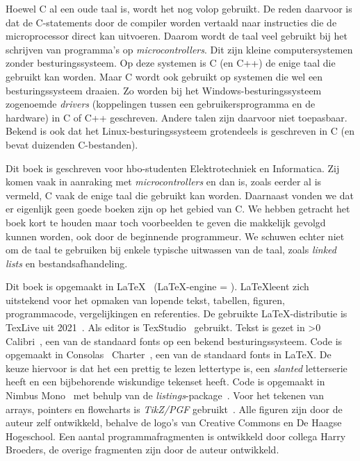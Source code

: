 Hoewel C al een oude taal is, wordt het nog volop gebruikt. De reden daarvoor is
dat de C-statements door de compiler worden vertaald naar instructies die de
microprocessor direct kan uitvoeren. Daarom wordt de taal veel gebruikt bij
het schrijven van programma's op \textsl{microcontrollers}. Dit zijn kleine
computersystemen
zonder besturingssysteem. Op deze systemen is C (en C++) de enige taal die
gebruikt kan worden. Maar C wordt ook gebruikt op systemen die wel een
besturingssysteem draaien. Zo worden bij het Windows-besturingssysteem
zogenoemde \textsl{drivers} (koppelingen tussen een gebruikersprogramma
en de hardware) in C of C++ geschreven. Andere talen zijn
daarvoor niet toepasbaar. Bekend is ook dat het Linux-besturingssysteem
grotendeels is geschreven in C (en bevat duizenden C-bestanden).

Dit boek is geschreven voor hbo-studenten Elektrotechniek en Informatica. Zij
komen vaak in aanraking met \textsl{microcontrollers} en dan is, zoals eerder al
is vermeld, C vaak de enige taal die gebruikt kan worden. Daarnaast vonden we dat
er eigenlijk geen goede boeken zijn op het gebied van C. We hebben getracht het
boek kort te houden maar toch voorbeelden te geven die makkelijk gevolgd kunnen
worden, ook door de beginnende programmeur. We schuwen echter niet om de taal
te gebruiken bij enkele typische uitwassen van de taal, zoals \textsl{linked lists}
en bestandsafhandeling.

Dit boek is opgemaakt in \LaTeX~\cite{latexwebsite} (\LaTeX-engine = \booktexbanner).
\LaTeX\@ leent zich uitstekend
voor het opmaken van lopende tekst, tabellen, figuren, programmacode, vergelijkingen
en referenties. De gebruikte \LaTeX-distributie is TexLive uit 2021~\cite{texlivewebsite}.
Als editor is TexStudio~\cite{texstudiowebsite} gebruikt. Tekst is gezet in
\fi{}\fi>0
Calibri~\cite{calibrifont}, een van de standaard fonts op een bekend besturingssysteem.
Code is opgemaakt in Consolas~\cite{consolasfont}
\else
Charter~\cite{charterfont}, een van de standaard fonts in \LaTeX.
De keuze hiervoor is dat het een prettig te lezen lettertype is, een
\textsl{slanted} letterserie heeft en een bijbehorende wiskundige tekenset heeft.
Code is opgemaakt in Nimbus Mono~\cite{nimbusfont}
\fi
met behulp van de \textsl{listings}-package~\cite{listingsctan}.
Voor het
tekenen van arrays, pointers en flowcharts is \textsl{TikZ/PGF} gebruikt~\cite{tikzctan}.
Alle figuren zijn door de auteur zelf ontwikkeld, behalve de logo's van Creative
Commons en De Haagse Hogeschool.
Een aantal programmafragmenten is ontwikkeld door collega Harry Broeders, de overige
fragmenten zijn door de auteur ontwikkeld.

